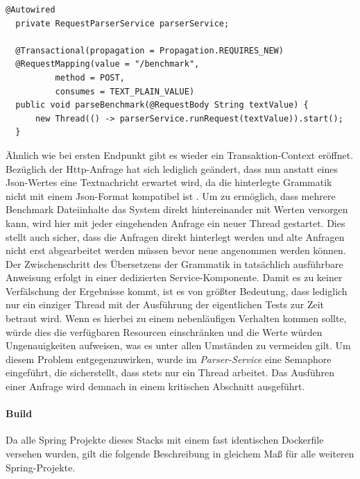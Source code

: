 \begin{lstlisting}[style=javaStyle,caption={Supplier - Bi Consumer},label=lst:supplierParserEndpoint]
  @Autowired
  private RequestParserService parserService;

  @Transactional(propagation = Propagation.REQUIRES_NEW)
  @RequestMapping(value = "/benchmark",
          method = POST,
          consumes = TEXT_PLAIN_VALUE)
  public void parseBenchmark(@RequestBody String textValue) {
      new Thread(() -> parserService.runRequest(textValue)).start();
  }
\end{lstlisting}

Ähnlich wie bei ersten Endpunkt gibt es wieder ein Transaktion-Context eröffnet. Bezüglich der Http-Anfrage hat sich lediglich geändert, dass nun anstatt eines Json-Wertes eine Textnachricht erwartet wird, da die hinterlegte Grammatik nicht mit einem Json-Format kompatibel ist . Um zu ermöglich, dass mehrere Benchmark Dateiinhalte das System direkt hintereinander mit Werten versorgen kann, wird hier mit jeder eingehenden Anfrage ein neuer Thread gestartet. Dies stellt auch sicher, dass die Anfragen direkt hinterlegt werden und alte Anfragen nicht erst abgearbeitet werden müssen bevor neue angenommen werden können. Der Zwischenschritt des Übersetzens der Grammatik in tatsächlich ausführbare Anweisung erfolgt in einer dedizierten Service-Komponente. Damit es zu keiner Verfälschung der Ergebnisse kommt, ist es von größter Bedeutung, dass lediglich nur ein einziger Thread mit der Ausführung der eigentlichen Tests zur Zeit betraut wird. Wenn es hierbei zu einem nebenläufigen Verhalten kommen sollte, würde dies die verfügbaren Resourcen einschränken und die Werte würden Ungenauigkeiten aufweisen, was es unter allen Umständen zu vermeiden gilt. Um diesem Problem entgegenzuwirken, wurde im \emph{Parser-Service} eine Semaphore eingeführt, die sicherstellt, dass stets nur ein Thread arbeitet. Das Ausführen einer Anfrage wird demnach in einem kritischen Abschnitt ausgeführt. 


\paragraph{Build}
Da alle Spring Projekte dieses Stacks mit einem fast identischen Dockerfile versehen wurden, gilt die folgende Beschreibung in gleichem Maß für alle weiteren Spring-Projekte. 



